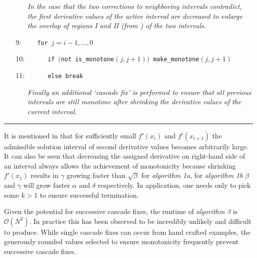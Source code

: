 \documentclass{article}
\begin{document}
\begin{itemize}
  \begin{itemize}
    \item[] \textit{In the case that the two corrections to neighboring intervals contradict, the first derivative values of the active interval are decreased to enlarge the overlap of regions I and II (from \cite{ulrich1994positivity}) of the two intervals.}
  \end{itemize}

\item[9:] $\quad\quad$\texttt{for $j=i-1,\ldots,0$}
\item[10:] $\quad\quad\quad$\texttt{if $\big($not is\_monotone$(j,j+1)\big)$  make\_monotone$(j,j+1)$}
\item[11:] $\quad\quad\quad$\texttt{else break}

  \begin{itemize}
    \item[] \textit{Finally an additional `cascade fix' is performed to ensure that all previous intervals are still monotone after shrinking the derivative values of the current interval.}
  \end{itemize}

\end{itemize}
\hrule
\vspace{10pt}

It is mentioned in \cite{ulrich1994positivity} that for sufficiently small $f'(x_i)$ and $f'(x_{i+1})$ the admissible solution interval of second derivative values becomes arbitrarily large. It can also be seen that decreasing the assigned derivative on right-hand side of an interval always allows the achievement of monotonicity because shrinking $f'(x_1)$ results in $\gamma$ growing faster than $\sqrt{\beta}$ for \textit{algorithm 1a}, for \textit{algorithm 1b} $\beta$ and $\gamma$ will grow faster $\alpha$ and $\delta$ respectively. In application, one needs only to pick some $k > 1$ to ensure successful termination.

Given the potential for successive cascade fixes, the runtime of \textit{algorithm 3} is $\mathcal{O}(N^2)$. In practice this has been observed to be incredibly unlikely and difficult to produce. While single cascade fixes can occur from hand crafted examples, the generously rounded values selected to ensure monotonicity frequently prevent successive cascade fixes.






\end{document}
